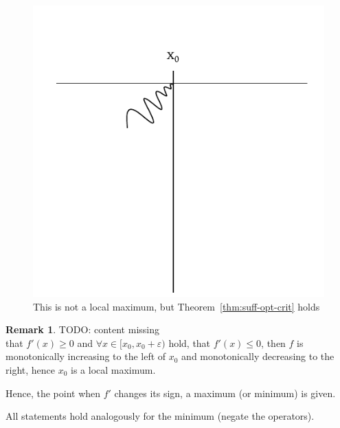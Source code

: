 \documentclass[a4paper,landscape,twocolumn]{article}
\theoremstyle{definition}
\newtheorem{rem}{Remark}
\begin{document}
\begin{figure}[!h]
  \begin{center}
    \includegraphics{img/counterexample_maximum.pdf}
    \caption{This is not a local maximum, but Theorem~\ref{thm:suff-opt-crit} holds}
    \label{counterexample}
  \end{center}
\end{figure}

\begin{rem}
  TODO: content missing \\
  that $f'(x) \geq 0$ and $\forall x \in [x_0, x_0 + \varepsilon)$ hold,
  that $f'(x) \leq 0$, then $f$ is monotonically increasing to the left of $x_0$
  and monotonically decreasing to the right, hence $x_0$ is a local maximum.

  Hence, the point when $f'$ changes its sign, a maximum (or minimum) is given.

  All statements hold analogously for the minimum (negate the operators).
\end{rem}
\end{document}
